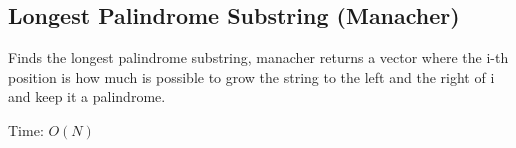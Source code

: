 \subsection{Longest Palindrome Substring (Manacher)}

Finds the longest palindrome substring, manacher returns a vector where the i-th position is how much is possible to grow the string to the left and the right of i and keep it a palindrome. 

Time: $O(N)$
